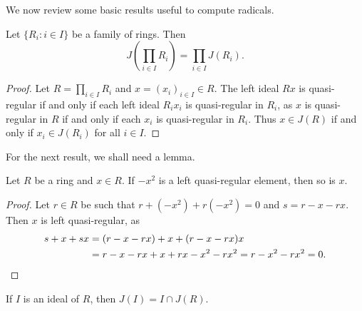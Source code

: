 We now review some basic results useful to compute radicals. 

\begin{proposition}
	Let $\{R_i:i\in I\}$ be a family of rings. Then 
	\[
	J\left(\prod_{i\in I}R_i\right)=\prod_{i\in I}J(R_i).
	\]
\end{proposition}

\begin{proof}
	Let $R=\prod_{i\in I}R_i$ and $x=(x_i)_{i\in I}\in R$.  The left ideal 
    $Rx$ is quasi-regular if and only if each left ideal $R_ix_i$
	is quasi-regular in $R_i$, as $x$ is quasi-regular in $R$ if and only if each 
	$x_i$ is quasi-regular in $R_i$. Thus $x\in J(R)$ if and only if $x_i\in
	J(R_i)$ for all $i\in I$.
\end{proof}

For the next result, we shall need a lemma.

\begin{lemma}
	\label{lemma:trickJ1}
	Let $R$ be a ring and $x\in R$. 
	If $-x^2$ is a left quasi-regular element, then so is $x$. 
\end{lemma}

\begin{proof}
	Let $r\in R$ be such that $r+(-x^2)+r(-x^2)=0$ and $s=r-x-rx$. Then
    $x$ is left quasi-regular, as 
    \begin{align*}
		s+x+sx&=(r-x-rx)+x+(r-x-rx)x\\
		&=r-x-rx+x+rx-x^2-rx^2=r-x^2-rx^2=0.\qedhere 
\end{align*}
\end{proof}

%

\begin{proposition}
	\label{proposition:J(I)}
	If $I$ is an ideal of $R$, then $J(I)=I\cap J(R)$. 
\end{proposition}


